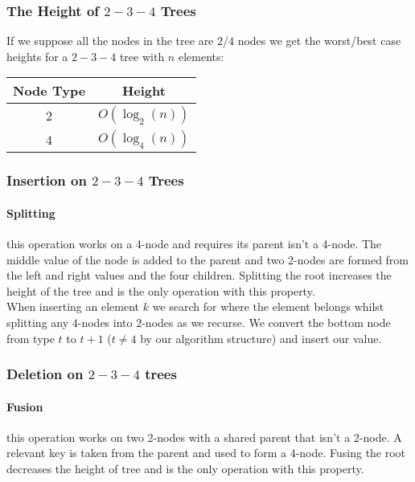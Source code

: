 \subsubsection{The Height of $2-3-4$ Trees}

If we suppose all the nodes in the tree are $2$/$4$ nodes we get the
worst/best case heights for a $2-3-4$ tree with $n$ elements: \begin{center}
  \begin{tabular}{| c | c |}
    \hline
    Node Type & Height \\
    \hline 
    \hline 
    2 & $O(\log_2(n))$ \\
    \hline 
    4 & $O(\log_4(n))$ \\
    \hline
  \end{tabular}
\end{center}

\subsubsection{Insertion on $2-3-4$ Trees}

\paragraph{Splitting} this operation works on a 4-node and requires its parent isn't
a 4-node. The middle value of the node is added to the parent and two 2-nodes are formed 
from the left and right values and the four children. Splitting the root increases
the height of the tree and is the only operation with this property.
\\[\baselineskip]
When inserting an element $k$ we search for where the element belongs whilst
splitting any $4$-nodes into $2$-nodes as we recurse. We convert the bottom node from
type $t$ to $t + 1$ ($t \neq 4$ by our algorithm structure) and insert our value.

\subsubsection{Deletion on $2-3-4$ trees}

\paragraph{Fusion} this operation works on two 2-nodes with a shared parent that isn't a
2-node. A relevant key is taken from the parent and used to form a $4$-node. Fusing the 
root decreases the height of tree and is the only operation with this property.

